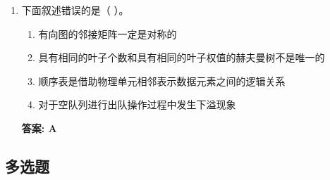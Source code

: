 \documentclass[12pt, a4paper]{article}
\begin{document}
\begin{enumerate}
    \item 下面叙述错误的是（ ）。
    \begin{enumerate}
        \item[A.] 有向图的邻接矩阵一定是对称的
        \item[B.] 具有相同的叶子个数和具有相同的叶子权值的赫夫曼树不是唯一的
        \item[C.] 顺序表是借助物理单元相邻表示数据元素之间的逻辑关系
        \item[D.] 对于空队列进行出队操作过程中发生下溢现象
    \end{enumerate}
    \textbf{答案: A}
\end{enumerate}

\subsection*{多选题}
\end{document}
